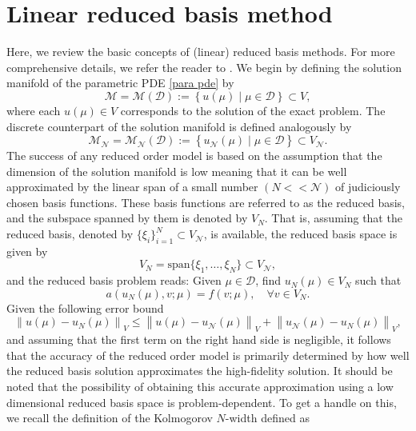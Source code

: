 \documentclass[12pt]{article}
\theoremstyle{remark}
\theoremstyle{definition}
\numberwithin{equation}{section}
\begin{document}
\section{Linear reduced basis method}
Here, we review the basic concepts of (linear) reduced basis methods. For more comprehensive details, we refer the reader to \cite{hesthaven2016certified,quarteroni2015reduced}. We begin by defining the solution manifold of the parametric PDE \eqref{para pde} by
\begin{equation}
    \mathcal{M}=\mathcal{M}(\mathcal{D}):=\left\{u(\mu) \mid \mu \in \mathcal{D}\right\} \subset V,
\end{equation}
where each $u(\mu) \in V$ corresponds to the solution of the exact problem. The discrete counterpart of the solution manifold is defined analogously by
\begin{equation}
    \mathcal{M}_{\mathcal{N}}=\mathcal{M}_{\mathcal{N}}(\mathcal{D}):=\left\{u_{\mathcal{N}}(\mu) \mid \mu \in \mathcal{D}\right\} \subset V_{\mathcal{N}}.
\end{equation}
The success of any reduced order model is based on the assumption that the dimension of the solution manifold is low meaning that it can be well approximated by the linear span of a small number $(N << {\mathcal{N}})$ of judiciously chosen basis functions. These basis functions are referred to as the reduced basis, and the subspace spanned by them is denoted by $V_N$. That is, assuming that the reduced basis, denoted by $\{\xi_i \}_{i=1}^N \subset V_{\mathcal{N}}$, is available, the reduced basis space is given by
\begin{equation}
    V_N=\text{span}\{\xi_1,\dots,\xi_N\} \subset V_{\mathcal{N}},
\end{equation}
and the reduced basis problem reads: Given $\mu \in \mathcal{D}$, find $u_N(\mu) \in V_N$ such that
\begin{equation}
    a\left(u_N(\mu), v ; \mu\right)=f\left(v ; \mu\right), \quad \forall v \in V_N.
    \label{rb prob}
\end{equation}
Given the following error bound
\begin{equation}
    \left\|u(\mu)-u_N(\mu)\right\|_{V} \leq\left\|u(\mu)-u_{\mathcal{N}}(\mu)\right\|_{V}+\left\|u_{\mathcal{N}}(\mu)-u_N(\mu)\right\|_{V},
\end{equation}
and assuming that the first term on the right hand side is negligible, it follows that the accuracy of the reduced order model is primarily determined by how well the reduced basis solution approximates the high-fidelity solution. It should be noted that the possibility of obtaining this accurate approximation using a low dimensional reduced basis space is problem-dependent. To get a handle on this, we recall the definition of the Kolmogorov $N$-width defined as
\end{document}
